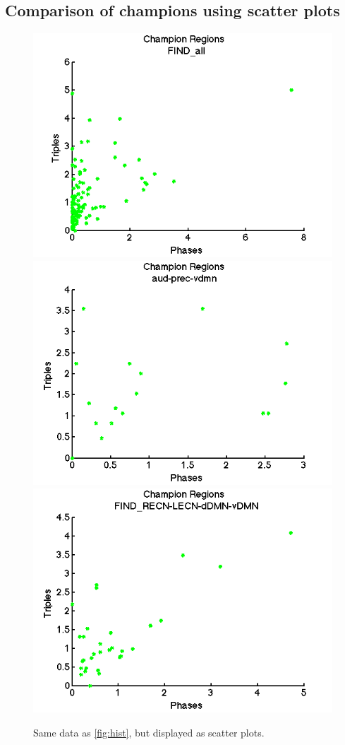 \documentclass[11pt]{article}
\begin{document}
\subsection{Comparison of champions using scatter plots}
\begin{figure}[H]
\centering
\includegraphics[width=.32\textwidth]{pictures/scatter_n5_cyclicity_FIND_all.png}
\includegraphics[width=.32\textwidth]{pictures/scatter_n5_cyclicity_aud-prec-vdmn.png}
\includegraphics[width=.32\textwidth]{pictures/scatter_n5_cyclicity_FIND_RECN-LECN-dDMN-vDMN.png}
\caption{Same data as \ref{fig:hist}, but displayed as scatter plots. }
\end{figure}
\end{document}
